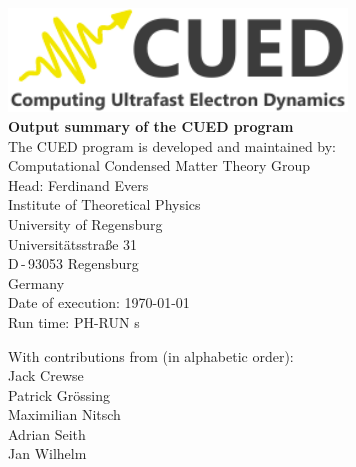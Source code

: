 \documentclass[11pt, a4paper]{scrartcl}
\begin{document}

\begin{titlepage}
  \sffamily
  \begin{center}
{
\includegraphics[width=9cm]{logo.pdf}
\\[5em]
\Huge \bfseries Output summary of the CUED program}
\\[3em]\large
The CUED program is developed and maintained by:
\\[3em]
Computational Condensed Matter Theory Group
\\[0.5em]
Head: Ferdinand Evers
  \\[0.5em]
Institute of Theoretical Physics
  \\[0.5em]
University of Regensburg
  \\[0.5em]
Universitätsstraße 31
  \\[0.5em]
D\,-\,93053 Regensburg
  \\[0.5em]
Germany
\\[3em]
Date of execution: \today
  \\[0.5em]
Run time: PH-RUN s
\\[3em]
  \end{center}{\large
  With contributions from (in alphabetic order): 
  \\[1em]
  Jack Crewse
  \\[0.5em]
  Patrick Grössing
  \\[0.5em]
  Maximilian Nitsch
  \\[0.5em]
  Adrian Seith
  \\[0.5em]
  Jan Wilhelm
  }
\end{titlepage}







\pagestyle{plain}




\tableofcontents


\pagestyle{fancy}
\end{document}
